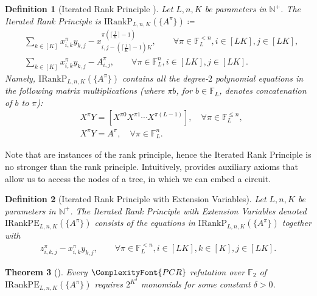 \documentclass[11pt,letter]{article}
\newtheorem{theorem}{Theorem}[section]
\newtheorem{definition}[theorem]{Definition}
\theoremstyle{remark} %
\newcommand{\IRankP}{\mathrm{IRankP}} %
\newcommand{\IRankPE}{\mathrm{IRankPE}} %
\newcommand{\PCR}{ %
    {
        \ComplexityFont{PCR}
    }
}
\newcommand{\F}{\mathbb{F}}
\begin{document}
{    \begin{definition}[Iterated Rank Principle \cite{GGRT25}]
        \label{def: Iterations of Rank Principle}
        Let $L,n,K$ be parameters in $\mathbb{N}^+$. The \emph{Iterated Rank Principle} is $\IRankP_{L,n,K}(\{A^\pi\}) \coloneqq$
        \begin{align*}
            &\sum_{k \in [K]} x_{i,k}^\pi y_{k,j} - x_{i, j- (\lceil \frac{j}{K} \rceil-1) K}^{\pi (\lceil \frac{j}{K} \rceil-1)}, \qquad \forall \pi \in \F_L^{< n}, i \in [LK], j \in [LK],\\
            &\sum_{k \in [K]} x_{i,k}^\pi y_{k,j} - A_{i,j}^\pi, \qquad \forall \pi \in \F_L^n ,i \in [LK], j \in [LK].
        \end{align*}
        Namely, $\IRankP_{L,n,K}(\{A^\pi\})$ contains all the degree-$2$ polynomial equations in the following matrix multiplications (where $\pi b$, for $b\in\F_L$, denotes concatenation of $b$ to $\pi$):
        \begin{align}
             & X^{\pi} Y = [X^{\pi  0} X^{\pi 1} \cdots X^{\pi  (L-1)}], \quad \forall \pi \in \F_L^{\leq n}, \label{eq:2810}\\
             & X^{\pi} Y = A^{\pi}, \quad \forall \pi \in \F_L^n . \label{eq:2811}
        \end{align}
    \end{definition}
    Note that  are instances of the rank principle, hence the Iterated Rank Principle is no stronger than the rank principle. Intuitively,  provides auxiliary axioms that allow us to access the nodes of a tree, in which we can embed a circuit.

    \begin{definition}[Iterated Rank Principle with Extension Variables]
        \label{def: iterations of rank principle with extension variables}
        Let $L,n,K$ be parameters in $\mathbb{N}^+$. The \emph{Iterated Rank Principle with Extension Variables} denoted $\IRankPE_{L,n,K}(\{A^\pi\}) $ consists of the equations in $ \IRankP_{L,n,K}(\{A^\pi\}) $ together with
        \begin{align*}
            z_{i,k,j}^\pi - x_{i,k}^\pi y_{k,j}, \qquad \forall \pi \in \F_L^{< n}, i \in [LK], k \in [K], j \in [LK].
        \end{align*}
    \end{definition}


    \begin{theorem}[\cite{GGRT25}]
        \label{theorem: exp lower bound for IRankP}
        Every $\PCR$ refutation over $\F_2$ of $\IRankPE_{L, n ,K}(\{A^\pi\})$ requires $2^{K^\delta}$ monomials for some constant $\delta>0$.
    \end{theorem}
    
}
\end{document}
